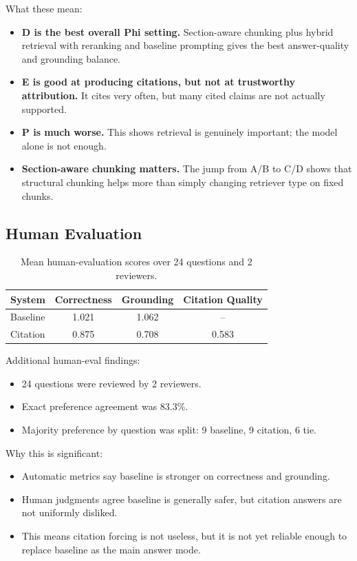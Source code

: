 \documentclass[11pt]{article}
\begin{document}
What these mean:
\begin{itemize}
  \item \textbf{D is the best overall Phi setting.} Section-aware chunking plus hybrid retrieval with reranking and baseline prompting gives the best answer-quality and grounding balance.
  \item \textbf{E is good at producing citations, but not at trustworthy attribution.} It cites very often, but many cited claims are not actually supported.
  \item \textbf{P is much worse.} This shows retrieval is genuinely important; the model alone is not enough.
  \item \textbf{Section-aware chunking matters.} The jump from A/B to C/D shows that structural chunking helps more than simply changing retriever type on fixed chunks.
\end{itemize}

\subsection{Human Evaluation}
\begin{table}[h]
\centering
\small
\begin{tabular}{lccc}
\toprule
\textbf{System} & \textbf{Correctness} & \textbf{Grounding} & \textbf{Citation Quality} \\
\midrule
Baseline & 1.021 & 1.062 & -- \\
Citation & 0.875 & 0.708 & 0.583 \\
\bottomrule
\end{tabular}
\caption{Mean human-evaluation scores over 24 questions and 2 reviewers.}
\end{table}

Additional human-eval findings:
\begin{itemize}
  \item 24 questions were reviewed by 2 reviewers.
  \item Exact preference agreement was 83.3\%.
  \item Majority preference by question was split: 9 baseline, 9 citation, 6 tie.
\end{itemize}

Why this is significant:
\begin{itemize}
  \item Automatic metrics say baseline is stronger on correctness and grounding.
  \item Human judgments agree baseline is generally safer, but citation answers are not uniformly disliked.
  \item This means citation forcing is not useless, but it is not yet reliable enough to replace baseline as the main answer mode.
\end{itemize}
\end{document}
